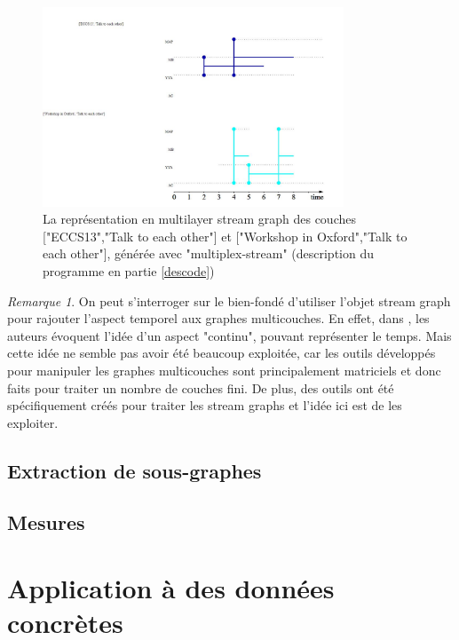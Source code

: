 \documentclass[11pt,a4paper]{article}
\theoremstyle{definition}
\theoremstyle{remark}
\newtheorem{rmq}{Remarque}
\theoremstyle{remark}
\begin{document}
	\begin{figure}[H]
		\centering
		\includegraphics[width=0.8\textwidth]{exMultiStream.JPG}
		\caption{La représentation en multilayer stream graph des couches ["ECCS13","Talk to each other"] et ["Workshop in Oxford","Talk to each other"], générée avec "multiplex-stream" (description du programme en partie \ref{descode})}
	\end{figure}
	
	\begin{rmq}
		On peut s'interroger sur le bien-fondé d'utiliser l'objet stream graph pour rajouter l'aspect temporel aux graphes multicouches. En effet, dans \cite{mlkiv}, les auteurs évoquent l'idée d'un aspect "continu", pouvant représenter le temps. Mais cette idée ne semble pas avoir été beaucoup exploitée, car les outils développés pour manipuler les graphes multicouches sont principalement matriciels et donc faits pour traiter un nombre de couches fini. De plus, des outils ont été spécifiquement créés pour traiter les stream graphs et l'idée ici est de les exploiter.
	
	\end{rmq}

\subsection{Extraction de sous-graphes}






\subsection{Mesures}



\section{Application à des données concrètes}
\end{document}
